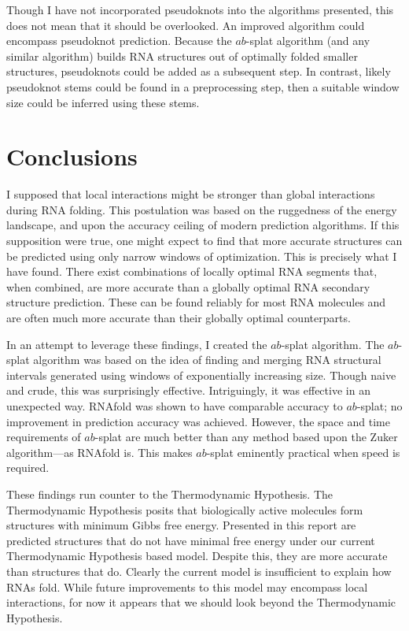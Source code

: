 \documentclass{cshonours}
\begin{document}
Though I have not incorporated pseudoknots into the algorithms presented, this does not mean that it should be overlooked. An improved algorithm could encompass pseudoknot prediction. Because the $ab$-splat algorithm (and any similar algorithm) builds RNA structures out of optimally folded smaller structures, pseudoknots could be added as a subsequent step. In contrast, likely pseudoknot stems could be found in a preprocessing step, then a suitable window size could be inferred using these stems.


\section{Conclusions}
I supposed that local interactions might be stronger than global interactions during RNA folding. This postulation was based on the ruggedness of the energy landscape, and upon the accuracy ceiling of modern prediction algorithms. If this supposition were true, one might expect to find that more accurate structures can be predicted using only narrow windows of optimization. This is precisely what I have found. There exist combinations of locally optimal RNA segments that, when combined, are more accurate than a globally optimal RNA secondary structure prediction. These can be found reliably for most RNA molecules and are often much more accurate than their globally optimal counterparts.

In an attempt to leverage these findings, I created the $ab$-splat algorithm. The $ab$-splat algorithm was based on the idea of finding and merging RNA structural intervals generated using windows of exponentially increasing size. Though naive and crude, this was surprisingly effective. Intriguingly, it was effective in an unexpected way. RNAfold was shown to have comparable accuracy to $ab$-splat; no improvement in prediction accuracy was achieved. However, the space and time requirements of $ab$-splat are much better than any method based upon the Zuker algorithm---as RNAfold is. This makes $ab$-splat eminently practical when speed is required.

These findings run counter to the Thermodynamic Hypothesis. The Thermodynamic Hypothesis posits that biologically active molecules form structures with minimum Gibbs free energy. Presented in this report are predicted structures that do not have minimal free energy under our current Thermodynamic Hypothesis based model. Despite this, they are more accurate than structures that do. Clearly the current model is insufficient to explain how RNAs fold. While future improvements to this model may encompass local interactions, for now it appears that we should look beyond the Thermodynamic Hypothesis.






\end{document}
